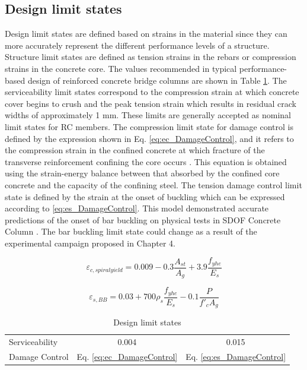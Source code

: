 \subsection{Design limit states}
Design limit states are defined based on strains in the material since they can more accurately represent the different performance levels of a structure. Structure limit states are defined as tension strains in the rebars or compression strains in the concrete core. The values recommended in typical performance-based design of reinforced concrete bridge columns are shown in Table  \ref{tab:DesignLimitStates}. The serviceability limit states correspond to the compression strain at which concrete cover begins to crush and the peak tension strain which results in residual crack widths of approximately 1 mm. These limits are generally accepted as nominal limit states for RC members. The compression limit state for damage control is defined by the expression shown in Eq. \ref{eq:ec_DamageControl}, and it refers to the compression strain in the confined concrete at which fracture of the transverse reinforcement confining the core occurs \cite{Priestley2007}. This equation is obtained using the strain-energy balance between that absorbed by the confined core concrete and the capacity of the confining steel. The tension damage control limit state is defined by the strain at the onset of buckling which can be expressed according to \ref{eq:es_DamageControl}. This model demonstrated accurate predictions of the onset of bar buckling on physical tests in SDOF Concrete Column \cite{Goodnight2016}. The bar buckling limit state could change as a result of the experimental campaign proposed in Chapter 4.

\begin{equation}
    \varepsilon_{c,spiral yield}=0.009-0.3\frac{A_{st}}{A_{g}} +3.9\frac{f_{yhe}}{E_{s}}
    \label{eq:ec_DamageControl}
\end{equation}

\begin{equation}
    \varepsilon_{s,BB}=0.03+700\rho_{s}  \frac{f_{yhe}}{E_{s}} -0.1\frac{P}{f'_{c}A_{g}}
    \label{eq:es_DamageControl}
\end{equation}


\begin{table}[htbp]
	\caption{Design limit states}
	\label{tab:DesignLimitStates}
	\centering	
		\begin{tabular}{|l|c|c|}
		\hline
		\cellcolor[HTML]{CC0000}{\color[HTML]{FFFFFF}Limit State} & \cellcolor[HTML]{CC0000}{\color[HTML]{FFFFFF}Concrete Limit State $\varepsilon_{c} (in/in)$} & \cellcolor[HTML]{CC0000}{\color[HTML]{FFFFFF}Reinforcing Steel Limit State $\varepsilon_{s} (in/in)$}\\  \hline	
		Serviceability       & 0.004                           & 0.015  \\  \hline	
		Damage Control       & Eq. \ref{eq:ec_DamageControl}   & Eq. \ref{eq:es_DamageControl}\\  \hline
		\end{tabular}
\end{table}
 
